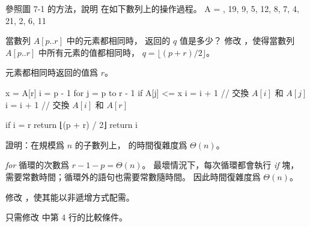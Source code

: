 \startsection[
  reference=section:desc_quicksort,
  title={Description of quicksort},
]

\startEXERCISE
參照圖 7-1 的方法，說明  在如下數列上的操作過程。
\startformula
A = , 19, 9, 5, 12, 8, 7, 4, 21, 2, 6, 11 \rangle
\stopformula
\stopEXERCISE

\startANSWER
{\externalfigure[output/e7_1_1-1]}
{\externalfigure[output/e7_1_1-2]}
{\externalfigure[output/e7_1_1-3]}
{\externalfigure[output/e7_1_1-4]}
{\externalfigure[output/e7_1_1-5]}
{\externalfigure[output/e7_1_1-6]}
{\externalfigure[output/e7_1_1-7]}
{\externalfigure[output/e7_1_1-8]}
{\externalfigure[output/e7_1_1-9]}
{\externalfigure[output/e7_1_1-10]}
{\externalfigure[output/e7_1_1-11]}
{\externalfigure[output/e7_1_1-12]}
{\externalfigure[output/e7_1_1-13]}
\stopANSWER

當數列 $A[p..r]$ 中的元素都相同時，  返回的 $q$ 值是多少？
修改 ，使得當數列 $A[p..r]$ 中所有元素的值都相同時，
 $q=\lfloor (p+r)/2\rfloor$。
\stopEXERCISE

\startANSWER
元素都相同時返回的值爲 $r$。

\startCLRSCODE
x = A[r]
i = p - 1
for j = p to r - 1
	if A[j] <= x
		i = i + 1
		// 交換 $A[i]$ 和 $A[j]$
i = i + 1
// 交換 $A[i]$ 和 $A[r]$

if i = r
	return ⌊(p + r) / 2⌋
return i
\stopCLRSCODE
\stopANSWER

\startEXERCISE
證明：在規模爲 $n$ 的子數列上，  的時間復雜度爲 $\Theta(n)$。
\stopEXERCISE

\startANSWER
\emph{for} 循環的次數爲 $r - 1 - p = \Theta(n)$。
最壞情況下，每次循環都會執行 \emph{if} 塊，
需要常數時間；循環外的語句也需要常數隨時間。
因此時間復雜度爲 $\Theta(n)$。
\stopANSWER

\startEXERCISE
修改 ，使其能以非遞增方式配需。
\stopEXERCISE

\startANSWER
只需修改  中第 4 行的比較條件。
\stopANSWER

\stopsection
